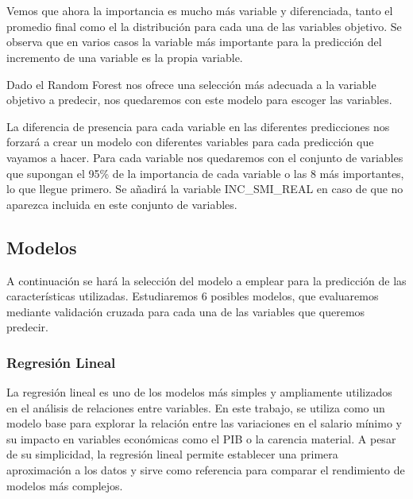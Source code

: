 \documentclass[11pt]{article}
\begin{document}
    \begin{center}
    \end{center}
    { \hspace*{\fill} \\}
    
    \begin{center}
    \end{center}
    { \hspace*{\fill} \\}
    
    Vemos que ahora la importancia es mucho más variable y diferenciada,
tanto el promedio final como el la distribución para cada una de las
variables objetivo. Se observa que en varios casos la variable más
importante para la predicción del incremento de una variable es la
propia variable.

Dado el Random Forest nos ofrece una selección más adecuada a la
variable objetivo a predecir, nos quedaremos con este modelo para
escoger las variables.

La diferencia de presencia para cada variable en las diferentes
predicciones nos forzará a crear un modelo con diferentes variables para
cada predicción que vayamos a hacer. Para cada variable nos quedaremos
con el conjunto de variables que supongan el 95\% de la importancia de
cada variable o las 8 más importantes, lo que llegue primero. Se añadirá
la variable INC\_SMI\_REAL en caso de que no aparezca incluida en este
conjunto de variables.

    \subsection{Modelos}\label{modelos}

    A continuación se hará la selección del modelo a emplear para la
predicción de las características utilizadas. Estudiaremos 6 posibles
modelos, que evaluaremos mediante validación cruzada para cada una de
las variables que queremos predecir.

    \subsubsection{Regresión Lineal}\label{regresiuxf3n-lineal}

    La regresión lineal es uno de los modelos más simples y ampliamente
utilizados en el análisis de relaciones entre variables. En este
trabajo, se utiliza como un modelo base para explorar la relación entre
las variaciones en el salario mínimo y su impacto en variables
económicas como el PIB o la carencia material. A pesar de su
simplicidad, la regresión lineal permite establecer una primera
aproximación a los datos y sirve como referencia para comparar el
rendimiento de modelos más complejos.
\end{document}
